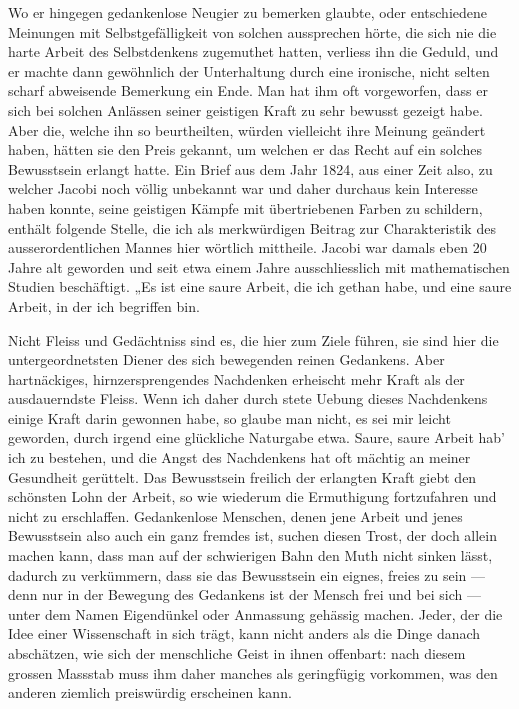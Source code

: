 \documentclass[11pt]{article}
\begin{document}
Wo er hingegen gedankenlose Neugier zu bemerken glaubte, oder entschiedene Meinungen mit Selbstgefälligkeit von solchen aussprechen hörte, die sich nie die harte Arbeit des Selbstdenkens zugemuthet hatten, verliess ihn die Geduld, und er machte dann gewöhnlich der Unterhaltung durch eine ironische, nicht selten scharf abweisende Bemerkung ein Ende. Man hat ihm oft vorgeworfen, dass er sich bei solchen Anlässen seiner geistigen Kraft zu sehr bewusst gezeigt habe. Aber die, welche ihn so beurtheilten, würden vielleicht ihre Meinung geändert haben, hätten sie den Preis gekannt, um welchen er das Recht auf ein solches Bewusstsein erlangt hatte. Ein Brief aus dem Jahr 1824, aus einer Zeit also, zu welcher Jacobi noch völlig unbekannt war und daher durchaus kein Interesse haben konnte, seine geistigen Kämpfe mit übertriebenen Farben zu schildern, enthält folgende Stelle, die ich als merkwürdigen Beitrag zur Charakteristik des ausserordentlichen Mannes hier wörtlich mittheile. Jacobi war damals eben 20 Jahre alt geworden und seit etwa einem Jahre ausschliesslich mit mathematischen Studien beschäftigt. „Es ist eine saure Arbeit, die ich gethan habe, und eine saure Arbeit, in der ich begriffen bin.

Nicht Fleiss und Gedächtniss sind es, die hier zum Ziele führen, sie sind hier die untergeordnetsten Diener des sich bewegenden reinen Gedankens. Aber hartnäckiges, hirnzersprengendes Nachdenken erheischt mehr Kraft als der ausdauerndste Fleiss. Wenn ich daher durch stete Uebung dieses Nachdenkens einige Kraft darin gewonnen habe, so glaube man nicht, es sei mir leicht geworden, durch irgend eine glückliche Naturgabe etwa. Saure, saure Arbeit hab’ ich zu bestehen, und die Angst des Nachdenkens hat oft mächtig an meiner Gesundheit gerüttelt. Das Bewusstsein freilich der erlangten Kraft giebt den schönsten Lohn der Arbeit, so wie wiederum die Ermuthigung fortzufahren und nicht zu erschlaffen. Gedankenlose Menschen, denen jene Arbeit und jenes Bewusstsein also auch ein ganz fremdes ist, suchen diesen Trost, der doch allein machen kann, dass man auf der schwierigen Bahn den Muth nicht sinken lässt, dadurch zu verkümmern, dass sie das Bewusstsein ein eignes, freies zu sein — denn nur in der Bewegung des Gedankens ist der Mensch frei und bei sich — unter dem Namen Eigendünkel oder Anmassung gehässig machen. Jeder, der die Idee einer Wissenschaft in sich trägt, kann nicht anders als die Dinge danach abschätzen, wie sich der menschliche Geist in ihnen offenbart: nach diesem grossen Massstab muss ihm daher manches als geringfügig vorkommen, was den anderen ziemlich preiswürdig erscheinen kann.
\end{document}
